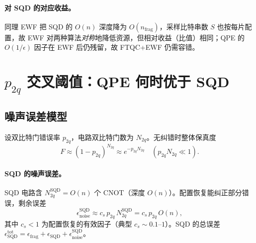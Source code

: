 \documentclass[11pt]{article}
\newcommand{\eps}{\epsilon}
\newcommand{\Oof}[1]{O(#1)}
\begin{document}
\paragraph{对 SQD 的对应收益。} 同理 EWF 把 SQD 的 $\Oof{n}$ 深度降为 $\Oof{n_{\mathrm{frag}}}$，采样比特串数 $S$ 也按每片配置，故 EWF 对两种算法\emph{对称}地降低资源，但相对收益（比值）相同；QPE 的 $\Oof{1/\eps}$ 因子在 EWF 后仍残留，故 FTQC+EWF 仍需容错。

\section{$p_{2q}$ 交叉阈值：QPE 何时优于 SQD}
\subsection{噪声误差模型}
设双比特门错误率 $p_{2q}$，电路双比特门数为 $N_{2q}$。无纠错时整体保真度
\begin{equation}
  F \approx (1-p_{2q})^{N_{2q}} \approx e^{-p_{2q}N_{2q}}\quad (p_{2q}N_{2q}\ll 1).
\end{equation}

\paragraph{SQD 的噪声误差。} SQD 电路含 $N_{2q}^{\mathrm{SQD}}=\Oof{n}$ 个 CNOT（深度 $\Oof{n}$）。配置恢复能纠正部分错误，剩余误差
\begin{equation}\label{eq:sqd-noise}
  \eps_{\mathrm{noise}}^{\mathrm{SQD}} \approx c_s\,p_{2q}\,N_{2q}^{\mathrm{SQD}} = c_s\,p_{2q}\,\Oof{n},
\end{equation}
其中 $c_s<1$ 为配置恢复的有效因子（典型 $c_s\sim 0.1$--$1$）。SQD 的总误差 $\eps_{\mathrm{SQD}}^{\mathrm{tot}}=\eps_{\mathrm{frag}}+\eps_{\mathrm{SQD}}+\eps_{\mathrm{noise}}^{\mathrm{SQD}}$。
\end{document}
